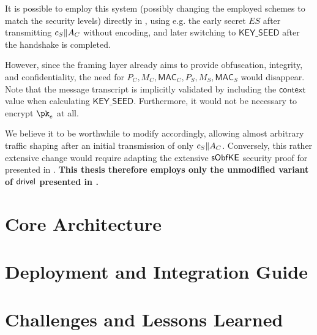 It is possible to employ this system (possibly changing the employed schemes to match 
the security levels) directly in \drivel{}, using e.g. the early secret $ES$ after transmitting $c_S \| A_C$ without encoding, and later switching to $\mathsf{KEY\_SEED}$ after the handshake is completed.

However, since the framing layer already aims to provide obfuscation, integrity, and confidentiality, the need for $P_C, M_C, \mathsf{MAC}_C, P_S, M_S, \mathsf{MAC}_S$ would disappear. Note that the message transcript is implicitly validated by including the $\mathsf{context}$ value when calculating $\mathsf{KEY\_SEED}$. Furthermore, it would not be necessary to encrypt $\pk_e$ at all.

We believe it to be worthwhile to modify \drivel{} accordingly, allowing almost arbitrary traffic shaping after an initial transmission of only $c_S \| A_C$.
Conversely, this rather extensive change would require adapting the extensive $\mathsf{sObfKE}$ security proof for \drivel{} presented in \cite{EPRINT:GRSV25}.
\textbf{This thesis therefore employs only the unmodified variant of $\textsf{drivel}{}$ presented in \cite[Figure~6]{EPRINT:GRSV25}.}

\section{Core Architecture} \label{sec:impl-architecture}

\section{Deployment and Integration Guide} \label{sec:deployment}

\section{Challenges and Lessons Learned} \label{sec:challenges-learnings}
